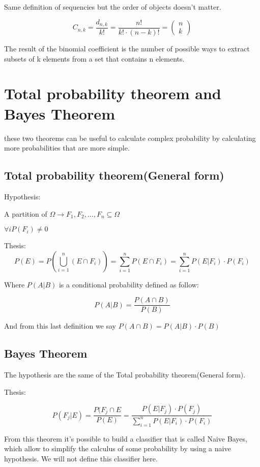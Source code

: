 \documentclass{article}
\begin{document}
Same definition of sequencies but the order of objects doesn't matter.

$$C_{n,k} = \frac{d_{n,k}}{k!} = \frac{n!}{k! \cdot (n-k)!} = \left(\begin{array}{c} n \\ k \end{array}\right)$$

\bigskip

The result of the binomial coefficient is the number of possible ways to extract subsets of k elements from a set that contains n elements.

\section{Total probability theorem and Bayes Theorem}

these two theorems can be useful to calculate complex probability by calculating more probabilities that are more simple.

\subsection{Total probability theorem(General form)}

Hypothesis:
\bigskip

A partition of $\Omega \longrightarrow F_1,F_2,...,F_n \subseteq \Omega$ 

$\forall i P(F_i) \neq 0$
\bigskip

Thesis:
$$P(E) = P(\bigcup_{i=1}^n (E \cap F_i)) = \sum_{i=1}^n P(E \cap F_i) = \sum_{i=1}^nP(E|F_i)\cdot P(F_i)$$

Where $P(A|B)$ is a conditional probability defined as follow:

$$P(A|B) = \frac{P(A \cap B)}{P(B)}$$

And from this last definition we say $P(A \cap B) = P(A|B) \cdot P(B)$ 

\subsection{Bayes Theorem}

The hypothesis are the same of the Total probability theorem(General form).
\bigskip

Thesis:

$$P(F_j|E) = \frac{P(F_j \cap E}{P(E)} = \frac{P(E|F_j)\cdot P(F_j)}{\sum_{i=1}^n P(E|F_i) \cdot P(F_i)}$$


From this theorem it's possible to build a classifier that is called Naive Bayes, which allow to simplify the calculus of some probability by using a naive hypothesis. We will not define this classifier here.
\end{document}
